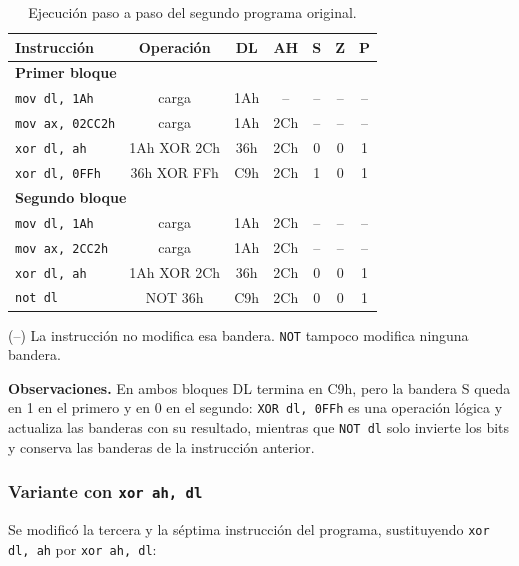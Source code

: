 \documentclass[10pt]{article}
\begin{document}
\begin{table}[htbp]
  \centering
  \caption{Ejecución paso a paso del segundo programa original.}
  \label{tab:p2-original}
  \begin{tabular}{|l|c|c|c|c|c|c|}
    \hline
    \textbf{Instrucción} & \textbf{Operación} & \textbf{DL} & \textbf{AH} & \textbf{S} & \textbf{Z} & \textbf{P} \\
    \hline
    \multicolumn{7}{|l|}{\textbf{Primer bloque}} \\
    \hline
    \texttt{mov dl, 1Ah} & carga & 1Ah & -- & -- & -- & -- \\
    \hline
    \texttt{mov ax, 02CC2h} & carga & 1Ah & 2Ch & -- & -- & -- \\
    \hline
    \texttt{xor dl, ah} & 1Ah XOR 2Ch & 36h & 2Ch & 0 & 0 & 1 \\
    \hline
    \texttt{xor dl, 0FFh} & 36h XOR FFh & C9h & 2Ch & 1 & 0 & 1 \\
    \hline
    \multicolumn{7}{|l|}{\textbf{Segundo bloque}} \\
    \hline
    \texttt{mov dl, 1Ah} & carga & 1Ah & 2Ch & -- & -- & -- \\
    \hline
    \texttt{mov ax, 2CC2h} & carga & 1Ah & 2Ch & -- & -- & -- \\
    \hline
    \texttt{xor dl, ah} & 1Ah XOR 2Ch & 36h & 2Ch & 0 & 0 & 1 \\
    \hline
    \texttt{not dl} & NOT 36h & C9h & 2Ch & 0 & 0 & 1 \\
    \hline
  \end{tabular}
 
  \smallskip
  {\small (--) La instrucción no modifica esa bandera. \texttt{NOT} tampoco modifica ninguna bandera.}
\end{table}
 
\textbf{Observaciones.} En ambos bloques DL termina en C9h, pero la bandera S queda en 1 en el primero y en 0 en el segundo: \texttt{XOR dl, 0FFh} es una operación lógica y actualiza las banderas con su resultado, mientras que \texttt{NOT dl} solo invierte los bits y conserva las banderas de la instrucción anterior.
 
\subsubsection{Variante con \texttt{xor ah, dl}}
 
Se modificó la tercera y la séptima instrucción del programa, sustituyendo \texttt{xor dl, ah} por \texttt{xor ah, dl}:
\end{document}
